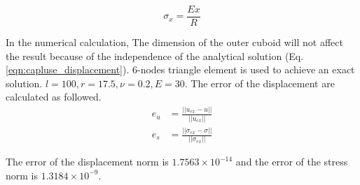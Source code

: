 \begin{equation}
  \sigma_x = \frac{Ex}{R}
  \label{eqn:caplus_stress}
\end{equation}

In the numerical calculation, The dimension of the outer cuboid will not affect the result because of the independence of the analytical solution (Eq.\ref{eqn:capluse_displacement}). 6-nodes triangle element is used to achieve an exact solution. $l=100,r=17.5,\nu=0.2,E=30$. The error of the displacement are calculated as followed.
\begin{subequations}
\begin{align}
e_u &= \frac{||u_{ex} - u||}{||u_{ex}||}\\
e_s &= \frac{||\sigma_{ex} - \sigma||}{||\sigma_{ex}||}
\end{align}
\end{subequations}

The error of the displacement norm is $1.7563\times 10^{-14}$ and the error of the stress norm is $1.3184\times 10^{-9}$.
\pagebreak